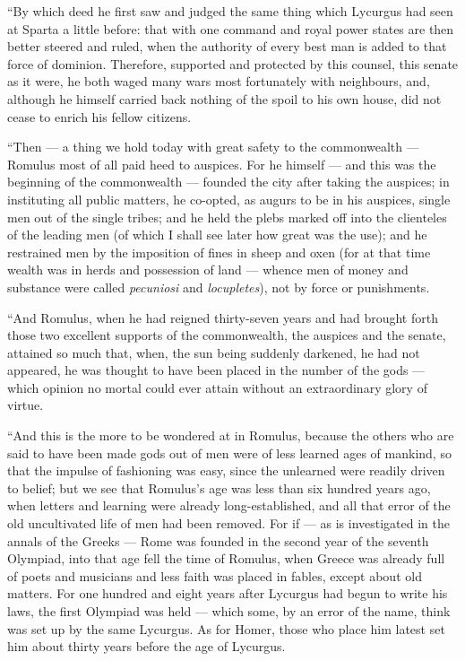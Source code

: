  ``By which deed he first saw and judged the same thing which Lycurgus had seen at Sparta a little before: that with one command and royal power states are then better steered and ruled, when the authority of every best man is added to that force of dominion. Therefore, supported and protected by this counsel, this senate as it were, he both waged many wars most fortunately with neighbours, and, although he himself carried back nothing of the spoil to his own house, did not cease to enrich his fellow citizens.

 ``Then --- a thing we hold today with great safety to the commonwealth --- Romulus most of all paid heed to auspices. For he himself --- and this was the beginning of the commonwealth --- founded the city after taking the auspices; in instituting all public matters, he co-opted, as augurs to be in his auspices, single men out of the single tribes; and he held the plebs marked off into the clienteles of the leading men (of which I shall see later how great was the use); and he restrained men by the imposition of fines in sheep and oxen (for at that time wealth was in herds and possession of land --- whence men of money and substance were called \textit{pecuniosi} and \textit{locupletes}), not by force or punishments.

 ``And Romulus, when he had reigned thirty-seven years and had brought forth those two excellent supports of the commonwealth, the auspices and the senate, attained so much that, when, the sun being suddenly darkened, he had not appeared, he was thought to have been placed in the number of the gods --- which opinion no mortal could ever attain without an extraordinary glory of virtue.

 ``And this is the more to be wondered at in Romulus, because the others who are said to have been made gods out of men were of less learned ages of mankind, so that the impulse of fashioning was easy, since the unlearned were readily driven to belief; but we see that Romulus's age was less than six hundred years ago, when letters and learning were already long-established, and all that error of the old uncultivated life of men had been removed. For if --- as is investigated in the annals of the Greeks --- Rome was founded in the second year of the seventh Olympiad, into that age fell the time of Romulus, when Greece was already full of poets and musicians and less faith was placed in fables, except about old matters. For one hundred and eight years after Lycurgus had begun to write his laws, the first Olympiad was held --- which some, by an error of the name, think was set up by the same Lycurgus. As for Homer, those who place him latest set him about thirty years before the age of Lycurgus.

